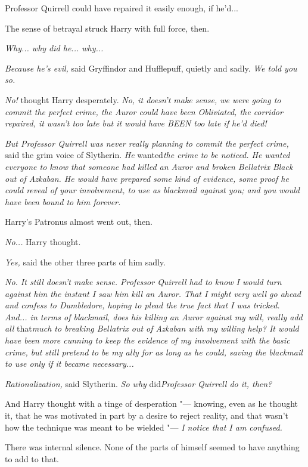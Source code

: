 Professor Quirrell could have repaired it easily enough, if he'd...

The sense of betrayal struck Harry with full force, then.

\emph{Why... why did he... why...}

\emph{Because he's evil,} said Gryffindor and Hufflepuff, quietly and
sadly. \emph{We told you so.}

\emph{No!} thought Harry desperately. \emph{No, it doesn't make sense,
we were going to commit the perfect crime, the Auror could have been
Obliviated, the corridor repaired, it wasn't too late but it would have
BEEN too late if he'd died!}

\emph{But Professor Quirrell was never really planning to commit the
perfect crime,} said the grim voice of Slytherin. \emph{He}
wanted\emph{the crime to be noticed. He wanted everyone to know that
someone had killed an Auror and broken Bellatrix Black out of Azkaban.
He would have prepared some kind of evidence, some proof he could reveal
of your involvement, to use as blackmail against you; and you would have
been bound to him forever.}

Harry's Patronus almost went out, then.

\emph{No...} Harry thought.

\emph{Yes,} said the other three parts of him sadly.

\emph{No. It still doesn't make sense. Professor Quirrell had to know I
would turn against him the instant I saw him kill an Auror. That I might
very well go ahead and confess to Dumbledore, hoping to plead the true
fact that I was tricked. And... in terms of blackmail, does his
killing an Auror against my will, really add all} that\emph{much to
breaking Bellatrix out of Azkaban with my willing help? It would have
been more cunning to keep the evidence of my involvement with the basic
crime, but still pretend to be my ally for as long as he could, saving
the blackmail to use only if it became necessary...}

\emph{Rationalization,} said Slytherin. \emph{So why} did\emph{Professor
Quirrell do it, then?}

And Harry thought with a tinge of desperation "--- knowing, even as he
thought it, that he was motivated in part by a desire to reject reality,
and that wasn't how the technique was meant to be wielded "--- \emph{I
notice that I am confused.}

There was internal silence. None of the parts of himself seemed to have
anything to add to that.

